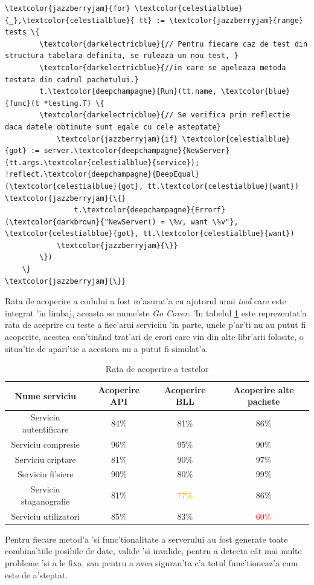 \documentclass[12pt,a4paper,twoside]{report}
\begin{document}
\begin{tcolorbox}
{\begin{Verbatim}[commandchars=\\\{\}]
	\textcolor{jazzberryjam}{for} \textcolor{celestialblue}{_},\textcolor{celestialblue}{ tt} := \textcolor{jazzberryjam}{range} tests \{
		\textcolor{darkelectricblue}{// Pentru fiecare caz de test din structura tabelara definita, se ruleaza un nou test, }
		\textcolor{darkelectricblue}{//in care se apeleaza metoda testata din cadrul pachetului.}
		t.\textcolor{deepchampagne}{Run}(tt.name, \textcolor{blue}{func}(t *testing.T) \{
		\textcolor{darkelectricblue}{// Se verifica prin reflectie daca datele obtinute sunt egale cu cele asteptate}
			\textcolor{jazzberryjam}{if} \textcolor{celestialblue}{got} := server.\textcolor{deepchampagne}{NewServer}(tt.args.\textcolor{celestialblue}{service}); !reflect.\textcolor{deepchampagne}{DeepEqual}(\textcolor{celestialblue}{got}, tt.\textcolor{celestialblue}{want}) \textcolor{jazzberryjam}{\{}
				t.\textcolor{deepchampagne}{Errorf}(\textcolor{darkbrown}{"NewServer() = \%v, want \%v"}, \textcolor{celestialblue}{got}, tt.\textcolor{celestialblue}{want})
			\textcolor{jazzberryjam}{\}}
		\})
	\}
\textcolor{jazzberryjam}{\}}
\end{Verbatim}
}
\end{tcolorbox}

Rata de acoperire a codului a fost m'asurat'a cu ajutorul unui \textit{tool} care este integrat 'in limbaj, aceasta se nume'ste \textit{Go Cover}. 'In tabelul \ref{table:coverage} este reprezentat'a rata de aceprire cu teste a fiec'arui serviciiu 'in  parte, unele p'ar'ti nu au putut fi acoperite, acestea con'tinând trat'ari de erori care vin din alte libr'arii folosite, o situa'tie de apari'tie a acestora nu a putut fi simulat'a.

\begin{table}[H]
\small{
\caption{Rata de acoperire a testelor}
\begin{tabular}{|c|c|c|c|}          
\hline                     
Nume serviciu & Acoperire API & Acoperire BLL  & Acoperire alte pachete  \\ [0.5ex]   
\hline
Serviciu autentificare & 84\% & 81\% & 86\% \\
\hline
Serviciu compresie& 96\%& 95\% & 90\% \\
\hline
Serviciu criptare & 81\% & 90\% & 97\% \\
\hline
Serviciu fi'siere &90\% & 80\% & 99\% \\
\hline
Serviciu staganografie & 81\% & \textcolor{orange}{77\%} & 86\% \\
\hline         
Serviciu utilizatori & 85\% & 83\% & \textcolor{red}{60\%} \\
\hline
                    
\end{tabular}
\label{table:coverage}   
}          
\end{table}
Pentru fiecare metod'a 'si func'tionalitate a serverului au fost generate toate combina'tiile posibile de date, valide 'si invalide, pentru a detecta cât mai multe probleme 'si a le fixa, sau pentru a avea siguran'ta c'a totul func'tioneaz'a cum este de a'steptat.
\end{document}
